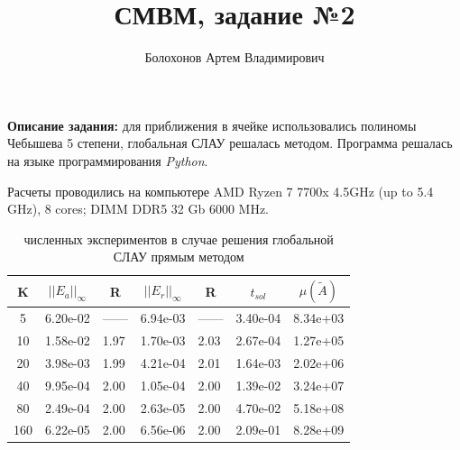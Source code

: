 \documentclass{article}
\title{СМВМ, задание №2}
\author{Болохонов Артем Владимирович}
\begin{document}
\date{}
\maketitle

\textbf{Описание задания:} для приближения в ячейке использовались полиномы Чебышева 5 степени, глобальная СЛАУ решалась методом. Программа решалась на языке программирования \textit{Python}.


Расчеты проводились на компьютере AMD Ryzen 7 7700x 4.5GHz (up to 5.4 GHz), 8 cores; DIMM DDR5 32 Gb 6000 MHz.


\begin{table}[H]
\centering
\begin{tabular}{|c|l|l|l|l|l|l|}
\hline
K   & \multicolumn{1}{c|}{$||E_a||_\infty$} & \multicolumn{1}{c|}{R} & \multicolumn{1}{c|}{$||E_r||_\infty$} & \multicolumn{1}{c|}{R} & \multicolumn{1}{c|}{$t_{sol}$} & \multicolumn{1}{c|}{$\mu(\tilde{A})$} \\ \hline
5   & 6.20e-02                              & ------                      & 6.94e-03                              & ------                      & 3.40e-04                       & 8.34e+03                              \\ \hline
10  & 1.58e-02                              & 1.97               & 1.70e-03                              & 2.03               & 2.67e-04                       & 1.27e+05                              \\ \hline
20  & 3.98e-03                              & 1.99               & 4.21e-04                              & 2.01               & 1.64e-03                       & 2.02e+06                              \\ \hline
40  & 9.95e-04                              & 2.00               & 1.05e-04                              & 2.00               & 1.39e-02                       & 3.24e+07                              \\ \hline
80  & 2.49e-04                              & 2.00               & 2.63e-05                              & 2.00               & 4.70e-02                       & 5.18e+08                              \\ \hline
160 & 6.22e-05                              & 2.00               & 6.56e-06                              & 2.00               & 2.09e-01                       & 8.28e+09                              \\ \hline
\end{tabular}
\caption{ численных экспериментов в случае решения глобальной СЛАУ прямым методом}
\end{table}
\end{document}
